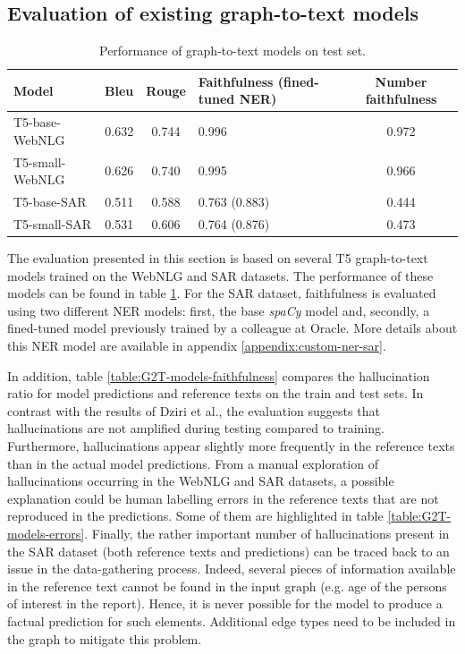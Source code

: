 \subsection{Evaluation of existing graph-to-text models} \label{experiment:G2T-raw-performance}
\begin{table}[ht]
\centering
\caption{Performance of graph-to-text models on test set.}
\label{table:G2T-models}
\begin{tabular}[t]{lcclc} %
\toprule
Model & Bleu & Rouge & Faithfulness (fined-tuned NER) & Number faithfulness \\
\midrule
T5-base-WebNLG     & 0.632 & 0.744 & 0.996         & 0.972 \\
T5-small-WebNLG    & 0.626 & 0.740 & 0.995         & 0.966 \\
T5-base-SAR        & 0.511 & 0.588 & 0.763 (0.883) & 0.444 \\
T5-small-SAR       & 0.531 & 0.606 & 0.764 (0.876) & 0.473 \\
\bottomrule
\end{tabular}
\end{table}%

 The evaluation presented in this section is based on several T5 graph-to-text models trained on the WebNLG and SAR datasets. The performance of these models can be found in table \ref{table:G2T-models}. For the SAR dataset, faithfulness is evaluated using two different NER models: first, the base \textit{spaCy} model and, secondly, a fined-tuned model previously trained by a colleague at Oracle. More details about this NER model are available in appendix \ref{appendix:custom-ner-sar}.



In addition, table \ref{table:G2T-models-faithfulness} compares the hallucination ratio for model predictions and reference texts on the train and test sets. In contrast with the results of Dziri et al.\cite{originHalluDataOrModel}, the evaluation suggests that hallucinations are not amplified during testing compared to training. Furthermore, hallucinations appear slightly more frequently in the reference texts than in the actual model predictions. From a manual exploration of hallucinations occurring in the WebNLG and SAR datasets, a possible explanation could be human labelling errors in the reference texts that are not reproduced in the predictions. Some of them are highlighted in table \ref{table:G2T-models-errors}. Finally, the rather important number of hallucinations present in the SAR dataset (both reference texts and predictions) can be traced back to an issue in the data-gathering process. Indeed, several pieces of information available in the reference text cannot be found in the input graph (e.g. age of the persons of interest in the report). Hence, it is never possible for the model to produce a factual prediction for such elements. Additional edge types need to be included in the graph to mitigate this problem.

